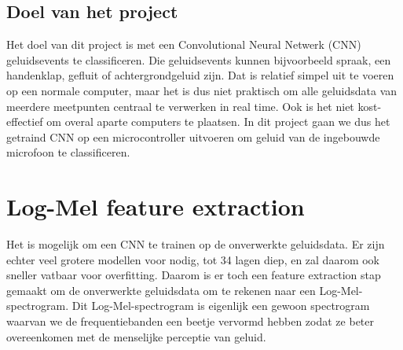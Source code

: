 \subsection{Doel van het project}

Het doel van dit project is met een Convolutional Neural Netwerk (CNN) geluidsevents te classificeren.
Die geluidsevents kunnen bijvoorbeeld spraak, een handenklap, gefluit of achtergrondgeluid zijn.
Dat is relatief simpel uit te voeren op een normale computer, maar het is dus niet praktisch om alle geluidsdata van meerdere meetpunten centraal te verwerken in real time.
Ook is het niet kost-effectief om overal aparte computers te plaatsen. In dit project gaan we dus het getraind CNN op een microcontroller uitvoeren om geluid van de ingebouwde microfoon te classificeren.

\section{Log-Mel feature extraction}

Het is mogelijk om een CNN te trainen op de onverwerkte geluidsdata.
Er zijn echter veel grotere modellen voor nodig, tot 34 lagen diep, en zal daarom ook sneller vatbaar voor overfitting. \cite{IEEE:very-deep-cnn-raw-waveforms}
Daarom is er toch een feature extraction stap gemaakt om de onverwerkte geluidsdata om te rekenen naar een Log-Mel-spectrogram.
Dit Log-Mel-spectrogram is eigenlijk een gewoon spectrogram waarvan we de frequentiebanden een beetje vervormd hebben zodat ze beter overeenkomen met de menselijke perceptie van geluid. \cite{enwiki:Mel-freq-cepstrum}

